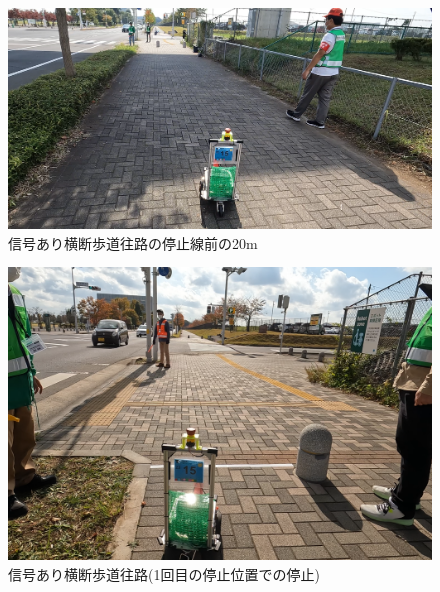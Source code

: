 \documentclass[twocolumn,9pt]{jsproceedings}
\begin{document}
\begin{figure}[h]
  \begin{center}
    \includegraphics[width=1.0\linewidth]{figs/20m_before_stop_line.pdf}
    \caption{信号あり横断歩道往路の停止線前の20m}
    \label{fig:20m_before_stop_line}
  \end{center}
\end{figure}

\begin{figure}[h]
  \begin{center}
    \includegraphics[width=1.0\linewidth]{figs/stop_first_stop_position.pdf}
    \caption{信号あり横断歩道往路(1回目の停止位置での停止)}
    \label{fig:stop_first_stop_position}
  \end{center}
\end{figure}
\end{document}
